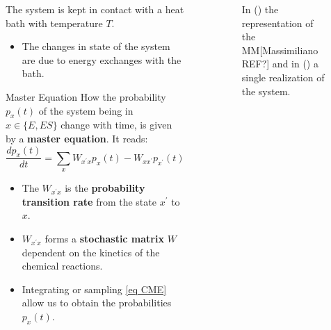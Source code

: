 \documentclass[final]{beamer}
\newlength{\sepwidth}
\newlength{\colwidth}
\newcommand{\separatorcolumn}{\begin{column}{\sepwidth}\end{column}}
\begin{document}
\begin{frame}[t]
\begin{columns}[t]
\begin{column}{\colwidth}
The system is kept in contact with a heat bath with temperature $T$.
\begin{itemize}
\item The changes in state of the system are due to energy exchanges with the bath.
\end{itemize}

\begin{block}{Master Equation}
How the probability $p_x(t)$ of the system being in $x \in \{E,ES\}$ change with time, is given by a {\bf master equation}\cite{van2007stochastic}. It reads:
%
\begin{equation}
\frac{dp_x(t)}{dt} = \sum_x W_{x^\prime x} p_x(t) -  W_{x x^\prime}p_{x^\prime}(t) \label{eq CME}
\end{equation}
\begin{itemize}
\item The $W_{x^\prime x}$ is the {\bf probability transition rate} from the state $x^\prime$ to $x$.
\item $W_{x^\prime x}$ forms a {\bf stochastic matrix} $W$ dependent on the kinetics of the chemical reactions.
\item Integrating or sampling \eqref{eq CME} allow us to obtain the probabilities $p_x(t)$.
\end{itemize}
\end{block}

\end{column}

\separatorcolumn

\begin{column}{\colwidth}
\begin{figure}
\label{fig 1}
\begin{subfigure}[b]{0.45\textwidth}

\caption{}
\label{fig 2-state-system}
\end{subfigure}
\begin{subfigure}[b]{0.45\textwidth}

\caption{}
\label{fig 2-state-system}
\end{subfigure}
\caption{In () the representation of the MM[Massimiliano REF?] and in () a single realization of the system.}
\end{figure}


\end{column}
\end{columns}
\end{frame}
\end{document}
